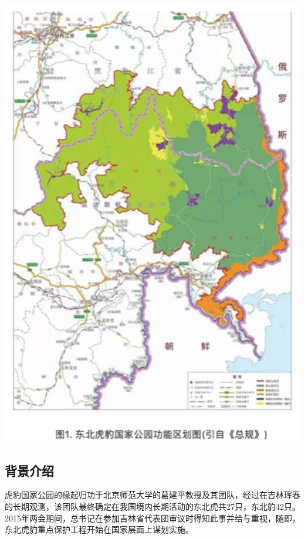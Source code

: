 \documentclass[]{book}
\begin{document}
\includegraphics[width=5.62in]{images/tiger1}

\hypertarget{ux80ccux666fux4ecbux7ecd}{%
\subsection{背景介绍}\label{ux80ccux666fux4ecbux7ecd}}

虎豹国家公园的缘起归功于北京师范大学的葛建平教授及其团队，经过在吉林珲春的长期观测，该团队最终确定在我国境内长期活动的东北虎共27只，东北豹42只。2015年两会期间，总书记在参加吉林省代表团审议时得知此事并给与重视，随即，东北虎豹重点保护工程开始在国家层面上谋划实施。
\end{document}
